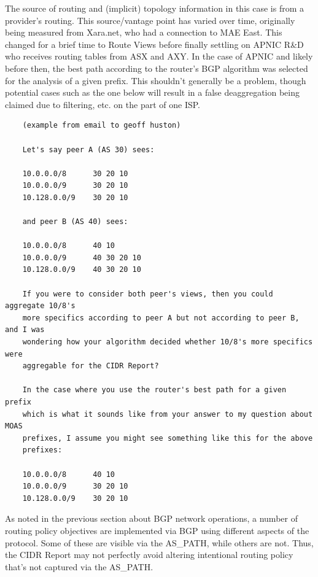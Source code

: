 
The source of routing and (implicit) topology information in this case is from a provider's routing. This source/vantage point has varied over time, originally being measured from Xara.net, who had a connection to MAE East. This changed for a brief time to Route Views before finally settling on APNIC R\&D who receives routing tables from ASX and AXY. In the case of APNIC and likely before then, the best path according to the router's BGP algorithm was selected for the analysis of a given prefix. This shouldn't generally be a problem, though potential cases such as the one below will result in a false deaggregation being claimed due to filtering, etc. on the part of one ISP.

\begin{verbatim}
	(example from email to geoff huston)

	Let's say peer A (AS 30) sees:

	10.0.0.0/8      30 20 10
	10.0.0.0/9      30 20 10
	10.128.0.0/9    30 20 10

	and peer B (AS 40) sees:

	10.0.0.0/8      40 10
	10.0.0.0/9      40 30 20 10
	10.128.0.0/9    40 30 20 10

	If you were to consider both peer's views, then you could aggregate 10/8's
	more specifics according to peer A but not according to peer B, and I was
	wondering how your algorithm decided whether 10/8's more specifics were
	aggregable for the CIDR Report?

	In the case where you use the router's best path for a given prefix
	which is what it sounds like from your answer to my question about MOAS
	prefixes, I assume you might see something like this for the above
	prefixes:

	10.0.0.0/8      40 10
	10.0.0.0/9      30 20 10
	10.128.0.0/9    30 20 10
\end{verbatim}

As noted in the previous section about BGP network operations, a number of routing policy objectives are implemented via BGP using different aspects of the protocol. Some of these are visible via the AS\_PATH, while others are not. Thus, the CIDR Report may not perfectly avoid altering intentional routing policy that's not captured via the AS\_PATH.

